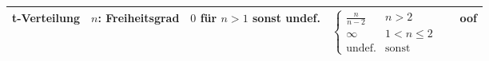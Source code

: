 \begin{fontsize}{10}{13}
{\begin{tabular}{||c|p{2cm}|*{4}{c|}|}
			t-Verteilung                                                                                   & $n$: Freiheitsgrad                                                                 & $0$ für $n>1$ sonst undef. & $\begin{cases} \frac{n}{n-2} &
              n > 2           \\ \infty & 1 < n \leq 2 \\ \text{undef.} & \text{sonst}\end{cases}$ &
			\raisebox{-2pt}{$\frac{\Gamma\left( \frac{n+1}{2}\right)}{\sqrt{n\pi} \cdot \Gamma(\frac{n}{2})}
			\left(1 + \frac{t^2}{n}\right)^{- \frac{n+1}{2}}$}                                             & oof                                                                                                                                                                                                                          \\[10pt]
			\hline
		\end{tabular}}
\end{fontsize}
\renewcommand{\arraystretch}{1}

